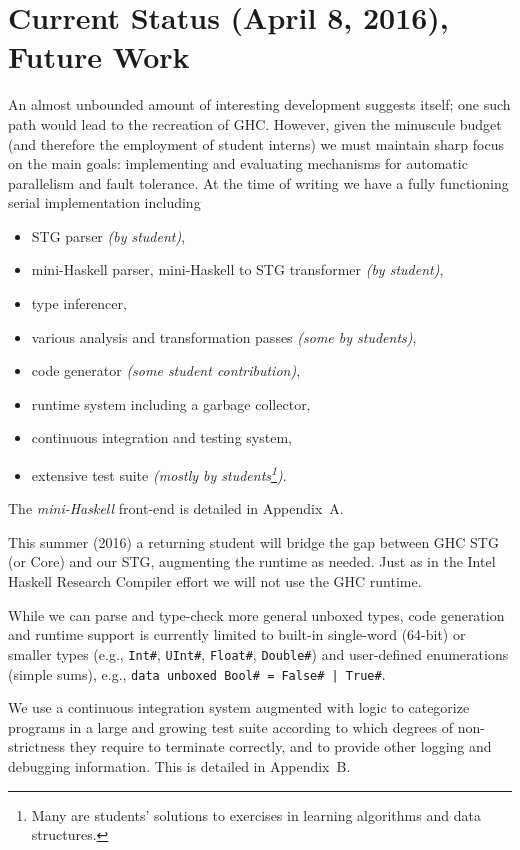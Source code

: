 \documentclass{llncs}
\begin{document}
\section{Current Status (April 8, 2016), Future Work}

An almost unbounded amount of interesting development suggests itself; one
such path would lead to the recreation of GHC.  However, given the minuscule
budget (and therefore the employment of student interns) we must maintain
sharp focus on the main goals: implementing and evaluating mechanisms for
automatic parallelism and fault tolerance.  At the time of writing we have a
fully functioning serial implementation including
\begin{itemize}
\item STG parser \emph{(by student)},
\item mini-Haskell parser, mini-Haskell to STG transformer \emph{(by student)},
\item type inferencer,
\item various analysis and transformation passes \emph{(some by students)},
\item code generator \emph{(some student contribution)},
\item runtime system including a garbage collector,
\item continuous integration and testing system,
\item extensive test suite \emph{(mostly by students\footnote{Many are
    students' solutions to exercises in learning algorithms and data
    structures.})}.
\end{itemize}

The \emph{mini-Haskell} front-end is detailed in Appendix~A.

This summer (2016) a returning student will bridge the gap between GHC STG (or
Core) and our STG, augmenting the runtime as needed.  Just as in the Intel
Haskell Research Compiler effort we will not use the GHC runtime.

While we can parse and type-check more general unboxed types, code generation
and runtime support is currently limited to built-in single-word (64-bit) or
smaller types (e.g., \texttt{Int\#}, \texttt{UInt\#}, \texttt{Float\#},
\texttt{Double\#}) and user-defined enumerations (simple sums), e.g.,
\texttt{data unboxed Bool\# = False\# | True\#}.

We use a continuous integration system augmented with logic to categorize
programs in a large and growing test suite according to which degrees of
non-strictness they require to terminate correctly, and to provide other
logging and debugging information.  This is detailed in Appendix~B.
\end{document}
